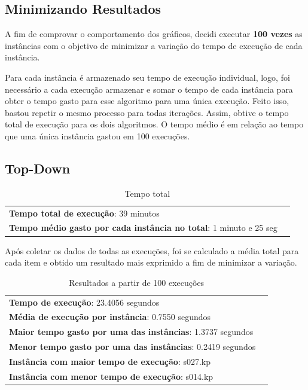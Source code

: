 \documentclass[a4paper, 12pt]{article}
\begin{document}
\subsection{Minimizando Resultados}
A fim de comprovar o comportamento dos gráficos, decidi executar {\bf 100 vezes} as instâncias com o objetivo de minimizar
a variação do tempo de execução de cada instância.

Para cada instância é armazenado seu tempo de execução individual, logo, foi necessário a cada execução
armazenar e somar o tempo de cada instância para obter o tempo gasto para esse algoritmo para uma única execução. Feito isso, bastou
repetir o mesmo processo para todas iterações. Assim, obtive o tempo total de execução para os dois algoritmos. 
O tempo médio é em relação ao tempo que uma única instância gastou em 100 execuções.
\subsection{Top-Down}
\begin{table}[!htb]
    \begin{tabular}{ll}
        {\bf Tempo total de execução}: 39 minutos\\
        {\bf Tempo médio gasto por cada instância no total}: 1 minuto e 25 seg
    \end{tabular}
    \caption{Tempo total}
    \label{tab:total_topdown}
\end{table}

Após coletar os dados de todas as execuções, foi se calculado a média total para cada item e obtido um resultado 
mais exprimido a fim de minimizar a variação.
\begin{table}[!htb]
    \begin{tabular}{ll}
        {\bf Tempo de execução}: 23.4056 segundos\\
        {\bf Média de execução por instância}: 0.7550 segundos\\
        {\bf Maior tempo gasto por uma das instâncias}: 1.3737 segundos\\
        {\bf Menor tempo gasto por uma das instâncias}: 0.2419 segundos \\
        {\bf Instância com maior tempo de execução}: s027.kp\\
        {\bf Instância com menor tempo de execução}: s014.kp
    \end{tabular}
    \caption{Resultados a partir de 100 execuções}
    \label{tab:result_tot_topdown}
\end{table}
\end{document}
